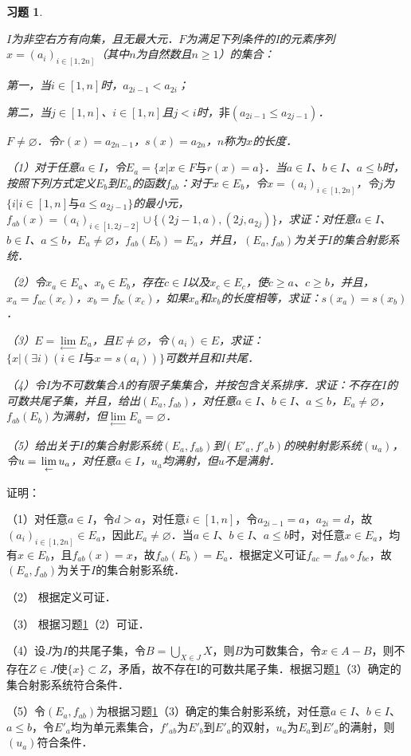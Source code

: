 \documentclass[12pt, a4paper, oneside]{book}
\newtheorem{exer}{习题}
\begin{document}
			\begin{exer}\label{exer192}
				\hfill\par
				$I$为非空右方有向集，且无最大元．$F$为满足下列条件的I的元素序列$x=(a_i)_{i\in [1, 2n]}$（其中$n$为自然数且$n\geq 1$）的集合：
				\par
				第一，当$i\in [1, n]$时，$a_{2i-1}<a_{2i}$；
				\par
				第二，当$j\in [1, n]$、$i\in [1, n]$且$j<i$时，$\text{非}(a_{2i-1}\leq a_{2j-1})$．
				\par
				$F\neq \varnothing$．令$r(x)=a_{2n-1}$，$s(x)=a_{2n}$，$n$称为$x$的长度．
				\par
				（1）对于任意$a\in I$，令$E_a=\{x|x\in F\text{与}r(x)=a\}$．当$a\in I$、$b\in I$、$a\leq b$时，按照下列方式定义$E_b$到$E_a$的函数$f_{ab}$：对于$x\in E_b$，令$x=(a_i)_{i\in [1, 2n]}$，令$j$为$\{i|i\in [1, n]\text{与}a\leq a_{2j-1}\}$的最小元，$f_{ab}(x)=(a_i)_{i\in [1, 2j-2]}\cup\{(2j-1, a), (2j, a_{2j})\}$，求证：对任意$a\in I$、$b\in I$、$a\leq b$，$E_a\neq \varnothing$，$f_{ab}(E_b)=E_a$，并且，$(E_a, f_{ab})$为关于$I$的集合射影系统．
				\par
				（2）令$x_a\in E_a$、$x_b\in E_b$，存在$c\in I$以及$x_c\in E_c$，使$c\geq a$、$c\geq b$，并且，$x_a=f_{ac}(x_c)$，$x_b=f_{bc}(x_c)$，如果$x_a$和$x_b$的长度相等，求证：$s(x_a)=s(x_b)$．
				\par
				（3）$E= \lim\limits_\gets E_a$，且$E\neq\varnothing$，令$(a_i)\in E$，求证：$\{x|(\exists i)(i\in I\text{与}x=s(a_i))\}$可数并且和$I$共尾．
				\par
				（4）令I为不可数集合A的有限子集集合，并按包含关系排序．求证：不存在$I$的可数共尾子集，并且，给出$(E_a, f_{ab})$，对任意$a\in I$、$b\in I$、$a\leq b$，$E_a\neq \varnothing$，$f_{ab}(E_b)$为满射，但$\lim\limits_\gets E_a=\varnothing$．
				\par
				（5）给出关于$I$的集合射影系统$(E_a, f_{ab})$到$({E'}_a, {f'}_ab)$的映射射影系统$(u_a)$，令$u=\\\lim\limits_\gets u_a$，对任意$a\in I$，$u_a$均满射，但$u$不是满射．
			\end{exer}
			证明：
			\par
			（1）对任意$a\in I$，令$d>a$，对任意$i\in [1, n]$，令$a_{2i-1}=a$，$a_{2i}=d$，故$(a_i)_{i\in [1, 2n]}\in E_a$，因此$E_a\neq \varnothing$．当$a\in I$、$b\in I$、$a\leq b$时，对任意$x\in E_a$，均有$x\in E_b$，且$f_{ab}(x)=x$，故$f_{ab}(E_b)=E_a$．根据定义可证$f_{ac}=f_{ab}\circ f_{bc}$，故$(E_a, f_{ab})$为关于$I$的集合射影系统．
			\par
			（2）	根据定义可证．
			\par
			（3）	根据习题\ref{exer192}（2）可证．
			\par
			（4）设$J$为$I$的共尾子集，令$B=\bigcup\limits_{X\in J}X$，则$B$为可数集合，令$x\in A-B$，则不存在$Z\in J$使$\{x\}\subset Z$，矛盾，故不存在I的可数共尾子集．根据习题\ref{exer192}（3）确定的集合射影系统符合条件．
			\par
			（5）令$(E_a, f_{ab})$为根据习题\ref{exer192}（3）确定的集合射影系统，对任意$a\in I$、$b\in I$、$a\leq b$，令${E'}_a$均为单元素集合，${f'}_{ab}$为${E'}_b$到${E'}_a$的双射，$u_a$为$E_a$到${E'}_a$的满射，则$(u_a)$符合条件．
			
\end{document}
